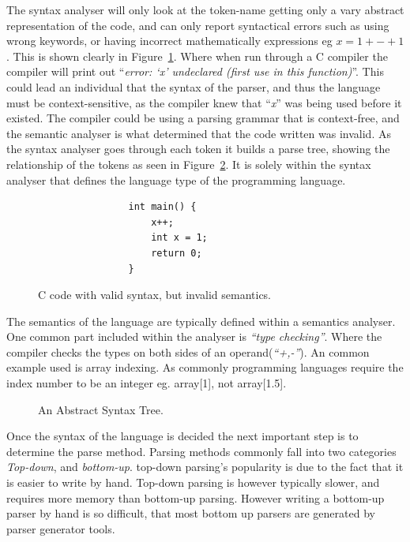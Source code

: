 The syntax analyser will only look at the token-name getting only a vary abstract representation of the code, and can only report syntactical errors such as using wrong keywords, or having incorrect mathematically expressions eg $x = 1 + - + 1$. This is shown clearly in Figure~\ref{fig:invalidC}. Where when run through a C compiler the compiler will print out ``\textit{error: \lq{}x\rq{} undeclared (first use in this function)}''. 
\newpage
This could lead an individual that the syntax of the parser, and thus the language must be context-sensitive, as the compiler knew that ``\textit{x}'' was being used before it existed. The compiler could be using a parsing grammar that is context-free, and the semantic analyser is what determined that the code written was invalid\cite{DragonBook}. As the syntax analyser goes through each token it builds a parse tree, showing the relationship of the tokens as seen in Figure~\ref{fig:AST}. It is solely within the syntax analyser that defines the language type of the programming language.
\begin{figure}[!hbtp]
    \begin{verbatim}
                int main() {
                    x++;
                    int x = 1;
                    return 0;
                }
    \end{verbatim}
    \caption{C code with valid syntax, but invalid semantics.}
    \label{fig:invalidC}
\end{figure}
The semantics of the language are typically defined within a semantics analyser. One common part included within the analyser is \textit{``type checking''}. Where the compiler checks the types on both sides of an operand(\textit{``+,-''}). An common example used is array indexing\cite{DragonBook}. As commonly programming languages require the index number to be an integer eg. array[1], not array[1.5].
\begin{figure}[!hbtp]
    \centering
    \caption{An Abstract Syntax Tree.}
    \label{fig:AST}
\end{figure}
\newpage
Once the syntax of the language is decided the next important step is to determine the parse method. Parsing methods commonly fall into two categories \textit{Top-down}, and \textit{bottom-up}. top-down parsing's popularity is due to the fact that it is easier to write by hand\cite{DragonBook}. Top-down parsing is however typically slower, and requires more memory than bottom-up parsing. However writing a bottom-up parser by hand is so difficult, that most bottom up parsers are generated by parser generator tools.


